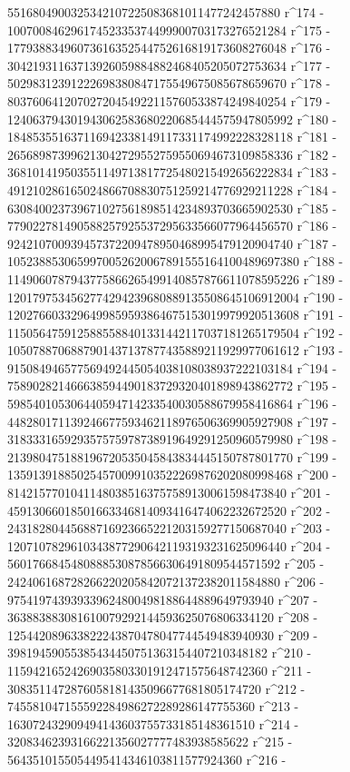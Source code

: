        5516804900325342107225083681011477242457880 r^174 - 
       10070084629617452335374499900703173276521284 r^175 - 
       17793883496073616352544752616819173608276048 r^176 - 
       30421931163713926059884882468405205072753634 r^177 - 
       50298312391222698380847175549675085678659670 r^178 - 
       80376064120702720454922115760533874249840254 r^179 - 
       124063794301943062583680220685444575947805992 r^180 - 
       184853551637116942338149117331174992228328118 r^181 - 
       265689873996213042729552759550694673109858336 r^182 - 
       368101419503551149713817725480215492656222834 r^183 - 
       491210286165024866708830751259214776929211228 r^184 - 
       630840023739671027561898514234893703665902530 r^185 - 
       779022781490588257925537295633566077964456570 r^186 - 
       924210700939457372209478950468995479120904740 r^187 - 
       1052388530659970052620067891555164100489697380 r^188 - 
       1149060787943775866265499140857876611078595226 r^189 - 
       1201797534562774294239680889135508645106912004 r^190 - 
       1202766033296499859593864675153019979920513608 r^191 - 
       1150564759125885588401331442117037181265179504 r^192 - 
       1050788706887901437137877435889211929977061612 r^193 - 
       915084946577569492445054038108038937222103184 r^194 - 
       758902821466638594490183729320401898943862772 r^195 - 
       598540105306440594714233540030588679958416864 r^196 - 
       448280171139246677593462118976506369905927908 r^197 - 
       318333165929357575978738919649291250960579980 r^198 - 
       213980475188196720535045843834445150787801770 r^199 - 
       135913918850254570099103522269876202080998468 r^200 - 
       81421577010411480385163757589130061598473840 r^201 - 
       45913066018501663346814093416474062232672520 r^202 - 
       24318280445688716923665221203159277150687040 r^203 - 
       12071078296103438772906421193193231625096440 r^204 - 
       5601766845480888530878566306491809544571592 r^205 - 
       2424061687282662202058420721372382011584880 r^206 - 
       975419743939339624800498188644889649793940 r^207 - 
       363883883081610079292144593625076806334120 r^208 - 
       125442089633822243870478047744549483940930 r^209 - 
       39819459055385434450751363154407210348182 r^210 - 
       11594216524269035803301912471575648742360 r^211 - 
       3083511472876058181435096677681805174720 r^212 - 
       745581047155592284986272289286147755360 r^213 - 
       163072432909494143603755733185148361510 r^214 - 
       32083462393166221356027777483938585622 r^215 - 
       5643510155054495414346103811577924360 r^216 - 
